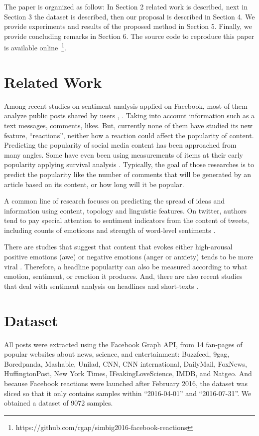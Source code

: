 \documentclass[10pt]{article}
\begin{document}
The paper is organized as follow: In Section 2 related work is described, next in Section 3 the dataset is described, then our proposal is described in Section 4. We provide experiments and results of the proposed method in Section 5. Finally, we provide concluding remarks in Section 6. The source code to reproduce this paper is available online~\footnote{https://github.com/rgap/simbig2016-facebook-reactions}.


\section{Related Work}

Among recent studies on sentiment analysis applied on Facebook, most of them analyze public posts shared by users \cite{rastogi2014sentiment}, \cite{gao2015more}. Taking into account information such as a text messages, comments, likes. But, currently none of them have studied its new feature, ``reactions'', neither how a reaction could affect the popularity of content. Predicting the popularity of social media content has been approached from many angles. Some have even been using measurements of items at their early popularity applying survival analysis \cite{lee2010approach}. Typically, the goal of those researches is to predict the popularity like the number of comments that will be generated by an article based on its content, or how long will it be popular.

A common line of research focuses on predicting the spread of ideas and information using content, topology and linguistic features. On twitter, authors tend to pay special attention to sentiment indicators from the content of tweets, including counts of emoticons and strength of word-level sentiments \cite{kong2014predicting}.

There are studies that suggest that content that evokes either high-arousal positive emotions (awe) or negative emotions (anger or anxiety) tends to be more viral \cite{berger2013emotion}. Therefore, a headline popularity can also be measured according to what emotion, sentiment, or reaction it produces. And, there are also recent studies that deal with sentiment analysis on headlines and short-texts \cite{nassirtoussi2015text}. 


\section{Dataset}

All posts were extracted using the Facebook Graph API, from 14 fan-pages of popular websites about news, science, and entertainment: Buzzfeed, 9gag, Boredpanda, Mashable, Unilad, CNN, CNN international, DailyMail, FoxNews, HuffingtonPost, New York Times, IFeakingLoveScience, IMDB, and Natgeo. And because Facebook reactions were launched after February 2016, the dataset was sliced so that it only contains samples within ``2016-04-01'' and ``2016-07-31''. We obtained a dataset of 9072 samples.
\end{document}
